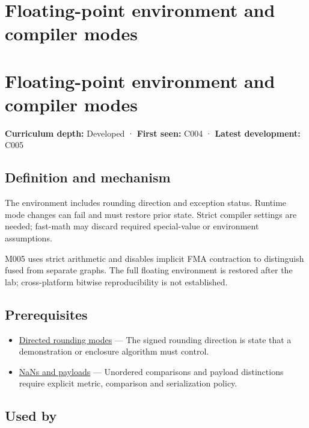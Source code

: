 \hypertarget{appendix-f11d1a521253}{}
\section*{Floating-point environment and compiler modes}
\section{Floating-point environment and compiler modes}\label{appendix-f11d1a521253-floating-point-environment-and-compiler-modes}

\textbf{Curriculum depth:} Developed · \textbf{First seen:} C004 · \textbf{Latest development:} C005

\subsection{Definition and mechanism}\label{appendix-f11d1a521253-definition-and-mechanism}

The environment includes rounding direction and exception status. Runtime mode changes can fail and must restore prior state. Strict compiler settings are needed; fast-math may discard required special-value or environment assumptions.

M005 uses strict arithmetic and disables implicit FMA contraction to distinguish fused from separate graphs. The full floating environment is restored after the lab; cross-platform bitwise reproducibility is not established.

\subsection{Prerequisites}\label{appendix-f11d1a521253-prerequisites}

\begin{itemize}
\tightlist
\item
  \hyperref[appendix-637d164ae5ca]{Directed rounding modes} --- The signed rounding direction is state that a demonstration or enclosure algorithm must control.
\item
  \hyperref[appendix-d6607cc4c235]{NaNs and payloads} --- Unordered comparisons and payload distinctions require explicit metric, comparison and serialization policy.
\end{itemize}

\subsection{Used by}\label{appendix-f11d1a521253-used-by}

